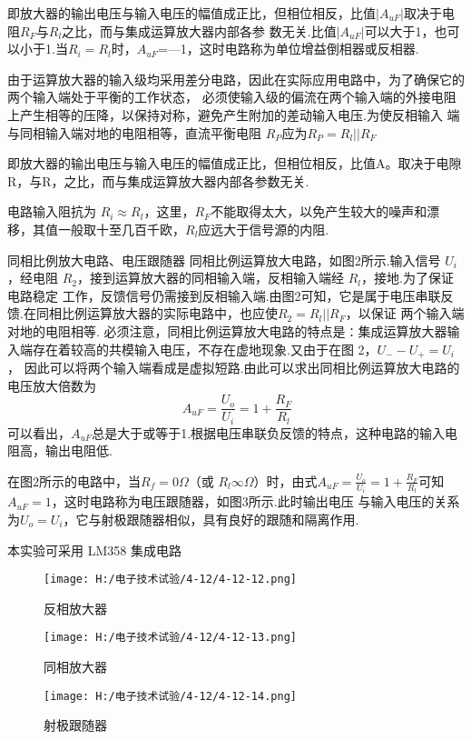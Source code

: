 \documentclass{article}
\begin{document}
		     \par
			即放大器的输出电压与输入电压的幅值成正比，但相位相反，比值$|A_{uF}|$取决于电阻$R_F$与$R_l$之比，而与集成运算放大器内部各参
			数无关.比值$|A_{uF}|$可以大于1，也可以小于1.当$R_i=R_l$时，$A_{uF}$=—1，这时电路称为单位增益倒相器或反相器.\par
			由于运算放大器的输入级均采用差分电路，因此在实际应用电路中，为了确保它的两个输入端处于平衡的工作状态，
			必须使输入级的偏流在两个输入端的外接电阻上产生相等的压降，以保持对称，避免产生附加的差动输入电压.为使反相输入
			端与同相输入端对地的电阻相等，直流平衡电阻 $R_P$应为$R_P=R_l||R_F$\par
			即放大器的输出电压与输入电压的幅值成正比，但相位相反，比值A。取决于电隙 R，与R，之比，而与集成运算放大器内部各参数无关. 
  
        电路输入阻抗为 $R_i\approx R_l$，这里，$R_F$不能取得太大，以免产生较大的噪声和漂移，其值一般取十至几百千欧，$R_l$应远大于信号源的内阻.\par
        同相比例放大电路、电压跟随器
         同相比例运算放大电路，如图2所示.输入信号 $U_i$，经电阻 $R_2$，接到运算放大器的同相输入端，反相输入端经 $R_l$，接地.为了保证电路稳定
		 工作，反馈信号仍需接到反相输入端.由图2可知，它是属于电压串联反馈.在同相比例运算放大器的实际电路中，也应使$R_2=R_l||R_F$，以保证
		 两个输入端对地的电阻相等.
        必须注意，同相比例运算放大电路的特点是∶集成运算放大器输入端存在着较高的共模输入电压，不存在虚地现象.又由于在图 2，$U_--U_+=U_i$，
		因此可以将两个输入端看成是虚拟短路.由此可以求出同相比例运算放大电路的电压放大倍数为
		\begin{equation*}
			\ A_{uF}=\frac{U_o}{U_i}=1+\frac{R_F}{R_l}
		\end{equation*}
		可以看出，$A_{uF}$总是大于或等于1.根据电压串联负反馈的特点，这种电路的输入电阻高，输出电阻低.\par
		在图2所示的电路中，当$R_f=0\Omega$（或 $R_l\infty\Omega$）时，由式$A_{uF}=\frac{U_o}{U_i}=1+\frac{R_F}{R_l}$可知$A_{uF}=1$，这时电路称为电压跟随器，如图3所示.此时输出电压
		与输入电压的关系为$U_o=U_i$，它与射极跟随器相似，具有良好的跟随和隔离作用.\par
		本实验可采用 LM358 集成电路
		
		\begin{figure}[h]
			\begin{minipage}[t]{0.33\linewidth} %
			  \centering   
			  \texttt{[image: H:/电子技术试验/4-12/4-12-12.png]}   
			  \caption{反相放大器}   
			  \label{fig:side:a}   
			\end{minipage}%
			\begin{minipage}[t]{0.33\linewidth}   
			  \centering   
			  \texttt{[image: H:/电子技术试验/4-12/4-12-13.png]}   
			  \caption{同相放大器}   
			  \label{fig:side:b}   
			\end{minipage}   
			\begin{minipage}[t]{0.33\linewidth}   
				\centering   
				\texttt{[image: H:/电子技术试验/4-12/4-12-14.png]}   
				\caption{射极跟随器}   
				\label{fig:side:b}   
			  \end{minipage}  
		  \end{figure}
		 
\end{document}
